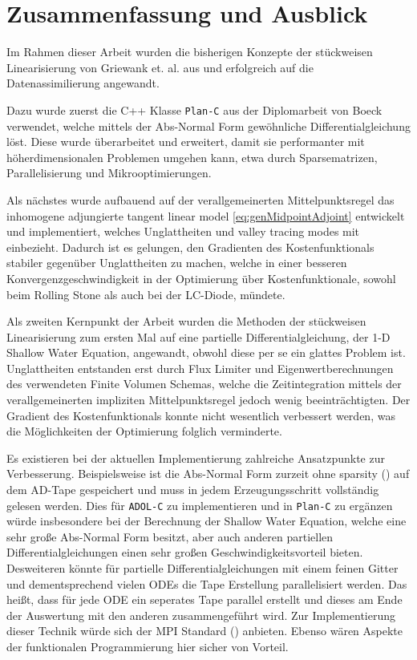 \chapter{Zusammenfassung und Ausblick}

Im Rahmen dieser Arbeit wurden die bisherigen Konzepte der stückweisen Linearisierung von Griewank et. al. aus \cite{monster} und \cite{plan} erfolgreich auf die Datenassimilierung angewandt.

Dazu wurde zuerst die C++ Klasse \texttt{Plan-C} aus der Diplomarbeit von Boeck \cite{boeck14} verwendet, welche mittels der Abs-Normal Form gewöhnliche Differentialgleichung löst. Diese wurde überarbeitet und erweitert, damit sie performanter mit höherdimensionalen Problemen umgehen kann, etwa durch Sparsematrizen, Parallelisierung und Mikrooptimierungen. 

Als nächstes wurde aufbauend auf der verallgemeinerten Mittelpunktsregel das inhomogene adjungierte tangent linear model \eqref{eq:genMidpointAdjoint} entwickelt und implementiert, welches Unglattheiten und valley tracing modes mit einbezieht. Dadurch ist es gelungen, den Gradienten des Kostenfunktionals stabiler gegenüber Unglattheiten zu machen, welche in einer besseren Konvergenzgeschwindigkeit in der Optimierung über Kostenfunktionale, sowohl beim Rolling Stone als auch bei der LC-Diode, mündete.

Als zweiten Kernpunkt der Arbeit wurden die Methoden der stückweisen Linearisierung zum ersten Mal auf eine partielle Differentialgleichung, der 1-D Shallow Water Equation, angewandt, obwohl diese per se ein glattes Problem ist. Unglattheiten entstanden erst durch Flux Limiter und Eigenwertberechnungen des verwendeten Finite Volumen Schemas, welche die Zeitintegration mittels der verallgemeinerten impliziten Mittelpunktsregel jedoch wenig beeinträchtigten.
Der Gradient des Kostenfunktionals konnte nicht wesentlich verbessert werden, was die Möglichkeiten der Optimierung folglich verminderte.

Es existieren bei der aktuellen Implementierung zahlreiche Ansatzpunkte zur Verbesserung. Beispielsweise ist die Abs-Normal Form zurzeit ohne sparsity (\cite[S.137 ff.]{griewank2008evaluating}) auf dem AD-Tape gespeichert und muss in jedem Erzeugungsschritt vollständig gelesen werden. Dies für \texttt{ADOL-C} zu implementieren und in \texttt{Plan-C} zu ergänzen  würde insbesondere bei der Berechnung der Shallow Water Equation, welche eine sehr große Abs-Normal Form besitzt, aber auch anderen partiellen Differentialgleichungen einen sehr großen Geschwindigkeitsvorteil bieten. 
Desweiteren könnte für partielle Differentialgleichungen mit einem feinen Gitter und dementsprechend vielen ODEs die Tape Erstellung parallelisiert werden. Das heißt, dass für jede ODE ein seperates Tape parallel erstellt und dieses am Ende der Auswertung mit den anderen zusammengeführt wird. Zur Implementierung dieser Technik würde sich der MPI Standard (\cite{mpi}) anbieten. Ebenso wären Aspekte der funktionalen Programmierung hier sicher von Vorteil.

